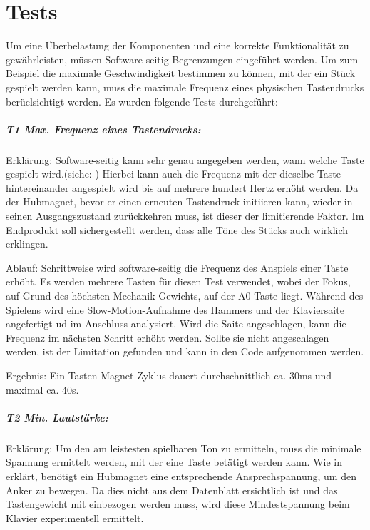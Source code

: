 \chapter{Tests}\label{tests}

\nocite{*}


Um eine Überbelastung der Komponenten und eine korrekte Funktionalität zu gewährleisten, müssen Software-seitig Begrenzungen eingeführt werden.
Um zum Beispiel die maximale Geschwindigkeit bestimmen zu können, mit der ein Stück gespielt werden kann, muss die maximale Frequenz eines physischen Tastendrucks berüclsichtigt werden.
Es wurden folgende Tests durchgeführt:

\paragraph{T1 Max. Frequenz eines Tastendrucks:}

Erklärung: Software-seitig kann sehr genau angegeben werden, wann welche Taste gespielt wird.(siehe: )
Hierbei kann auch die Frequenz mit der dieselbe Taste hintereinander angespielt wird bis auf mehrere hundert Hertz erhöht werden.
Da der Hubmagnet, bevor er einen erneuten Tastendruck initiieren kann, wieder in seinen Ausgangszustand zurückkehren muss, ist dieser der limitierende Faktor.
Im Endprodukt soll sichergestellt werden, dass alle Töne des Stücks auch wirklich erklingen.

Ablauf: Schrittweise wird software-seitig die Frequenz des Anspiels einer Taste erhöht.
Es werden mehrere Tasten für diesen Test verwendet, wobei der Fokus, auf Grund des höchsten Mechanik-Gewichts, auf der A0 Taste liegt.
Während des Spielens wird eine Slow-Motion-Aufnahme des Hammers und der Klaviersaite angefertigt ud im Anschluss analysiert.
Wird die Saite angeschlagen, kann die Frequenz im nächsten Schritt erhöht werden.
Sollte sie nicht angeschlagen werden, ist der Limitation gefunden und kann in den Code aufgenommen werden.

Ergebnis: Ein Tasten-Magnet-Zyklus dauert durchschnittlich ca. 30ms und maximal ca. 40s.

\paragraph{T2 Min. Lautstärke:}

Erklärung: Um den am leistesten spielbaren Ton zu ermitteln, muss die minimale Spannung ermittelt werden, mit der eine Taste betätigt werden kann.
Wie in  erklärt, benötigt ein Hubmagnet eine entsprechende Ansprechspannung, um den Anker zu bewegen.
Da dies nicht aus dem Datenblatt ersichtlich ist und das Tastengewicht mit einbezogen werden muss, wird diese Mindestspannung beim Klavier experimentell ermittelt.

